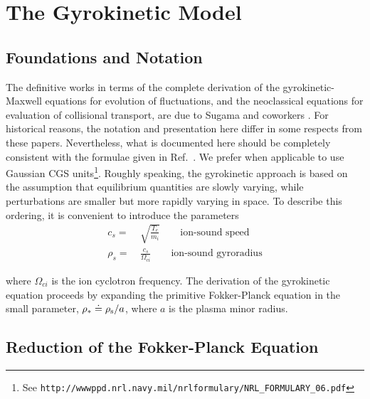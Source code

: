 \chapter{The Gyrokinetic Model}\label{chap.gkmodel}

\section{Foundations and Notation}\label{sec.gkintro}

The definitive works in terms of the complete derivation of the 
gyrokinetic-Maxwell equations for evolution of fluctuations, and 
the neoclassical equations for evaluation of collisional transport,
are due to Sugama and coworkers \cite{sugama:1997,sugama:1998}.
For historical reasons, the notation and presentation here differ 
in some respects from these papers.  Nevertheless, what is 
documented here should be completely consistent with the 
formulae given in Ref.~\cite{sugama:1998}.  We prefer when 
applicable to use Gaussian CGS units\footnote{
See {\tt http://wwwppd.nrl.navy.mil/nrlformulary/NRL\_FORMULARY\_06.pdf}}.  
Roughly speaking, the gyrokinetic approach \cite{antonsen:1980,catto:1981,frieman:1982} 
is based on the assumption that equilibrium quantities are slowly varying,
while perturbations are smaller but more rapidly varying in space.  To 
describe this ordering, it is convenient to introduce the parameters
%
\begin{align}
c_s = &~\sqrt{\frac{T_e}{m_i}} \qquad \text{ion-sound speed} \\
\rho_s = &~\frac{c_s}{\Omega_{ci}} 
     \qquad \text{ion-sound gyroradius} 
\end{align}

\noindent
where $\Omega_{ci}$ is the ion cyclotron frequency. 
The derivation of the gyrokinetic equation proceeds by 
expanding the primitive Fokker-Planck equation in 
the small parameter, $\rho_* \doteq \rho_{\rm s}/a$, 
where $a$ is the plasma minor radius.  

\section{Reduction of the Fokker-Planck Equation}
 
